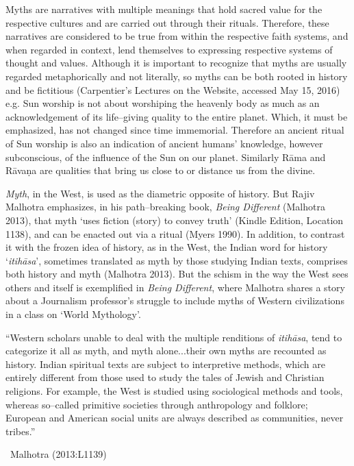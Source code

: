 Myths are narratives with multiple meanings that hold sacred value for the respective cultures and are carried out through their rituals. Therefore, these narratives are considered to be true from within the respective faith systems, and when regarded in context, lend themselves to expressing respective systems of thought and values. Although it is important to recognize that myths are usually regarded metaphorically and not literally, so myths can be both rooted in history and be fictitious (Carpentier’s Lectures on the Website, accessed May 15, 2016) e.g. Sun worship is not about worshiping the heavenly body as much as an acknowledgement of its life–giving quality to the entire planet. Which, it must be emphasized, has not changed since time immemorial. Therefore an ancient ritual of Sun worship is also an indication of ancient humans’ knowledge, however subconscious, of the influence of the Sun on our planet. Similarly Rāma and Rāvaṇa are qualities that bring us close to or distance us from the divine.

\textit{Myth}, in the West, is used as the diametric opposite of history. But Rajiv Malhotra emphasizes, in his path–breaking book, \textit{Being Different} (Malhotra 2013), that myth ‘uses fiction (story) to convey truth’ (Kindle Edition, Location 1138), and can be enacted out via a ritual (Myers 1990). In addition, to contrast it with the frozen idea of history, as in the West, the Indian word for history ‘\textit{itihāsa}’, sometimes translated as myth by those studying Indian texts, comprises both history and myth (Malhotra 2013). But the schism in the way the West sees others and itself is exemplified in \textit{Being Different}, where Malhotra shares a story about a Journalism professor’s struggle to include myths of Western civilizations in a class on ‘World Mythology’.

\begin{myquote}
“Western scholars unable to deal with the multiple renditions of \textit{itihāsa}, tend to categorize it all as myth, and myth alone...their own myths are recounted as history. Indian spiritual texts are subject to interpretive methods, which are entirely different from those used to study the tales of Jewish and Christian religions. For example, the West is studied using sociological methods and tools, whereas so–called primitive societies through anthropology and folklore; European and American social units are always described as communities, never tribes.”

~\hfill Malhotra (2013:L1139)
\end{myquote}

